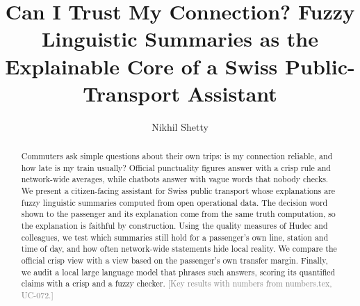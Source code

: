 \documentclass[manuscript,screen,nonacm]{acmart}
\newcommand{\placeholder}[1]{\textcolor{gray}{[#1]}}
\begin{document}
\title{Can I Trust My Connection? Fuzzy Linguistic Summaries as the Explainable Core of a
Swiss Public-Transport Assistant}

\author{Nikhil Shetty}

\begin{abstract}
Commuters ask simple questions about their own trips: is my connection reliable, and how
late is my train usually? Official punctuality figures answer with a crisp rule and
network-wide averages, while chatbots answer with vague words that nobody checks. We
present a citizen-facing assistant for Swiss public transport whose explanations are fuzzy
linguistic summaries computed from open operational data. The decision word shown to the
passenger and its explanation come from the same truth computation, so the explanation is
faithful by construction. Using the quality measures of Hudec and colleagues, we test which
summaries still hold for a passenger's own line, station and time of day, and how often
network-wide statements hide local reality. We compare the official crisp view with a view
based on the passenger's own transfer margin. Finally, we audit a local large language
model that phrases such answers, scoring its quantified claims with a crisp and a fuzzy
checker. \placeholder{Key results with numbers from numbers.tex, UC-072.}
\end{abstract}


\maketitle
\ResultsBanner














\appendix

\end{document}
